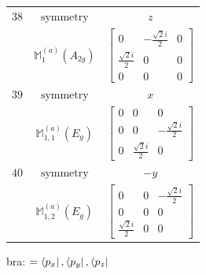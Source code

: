 \documentclass[fleqn,8pt,landscape]{jsarticle}
\begin{document}
\begin{longtable}{ccc}
$ 38 $ & $ \text{symmetry} $ & $ z $ \\
$  $ & $ \mathbb{M}_{1}^{(a)}(A_{2g}) $ & $ \begin{bmatrix} 0 & - \frac{\sqrt{2} i}{2} & 0 \\ \frac{\sqrt{2} i}{2} & 0 & 0 \\ 0 & 0 & 0 \end{bmatrix} $ \\ \hline
$ 39 $ & $ \text{symmetry} $ & $ x $ \\
$  $ & $ \mathbb{M}_{1,1}^{(a)}(E_{g}) $ & $ \begin{bmatrix} 0 & 0 & 0 \\ 0 & 0 & - \frac{\sqrt{2} i}{2} \\ 0 & \frac{\sqrt{2} i}{2} & 0 \end{bmatrix} $ \\ \hline
$ 40 $ & $ \text{symmetry} $ & $ - y $ \\
$  $ & $ \mathbb{M}_{1,2}^{(a)}(E_{g}) $ & $ \begin{bmatrix} 0 & 0 & - \frac{\sqrt{2} i}{2} \\ 0 & 0 & 0 \\ \frac{\sqrt{2} i}{2} & 0 & 0 \end{bmatrix} $ \\ \hline
\end{longtable}
bra: $=\bra{p_{x}}, \bra{p_{y}}, \bra{p_{z}}$
\end{document}
